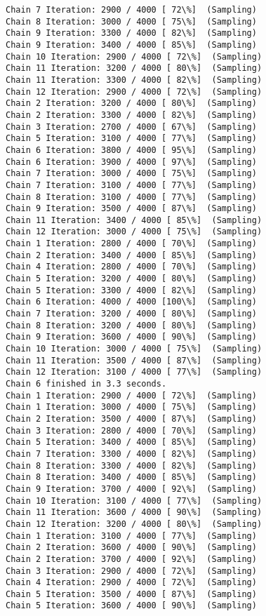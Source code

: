 \documentclass[11pt]{article}
\begin{document}
\begin{Verbatim}[commandchars=\\\{\}]
Chain 7 Iteration: 2900 / 4000 [ 72\%]  (Sampling)
Chain 8 Iteration: 3000 / 4000 [ 75\%]  (Sampling)
Chain 9 Iteration: 3300 / 4000 [ 82\%]  (Sampling)
Chain 9 Iteration: 3400 / 4000 [ 85\%]  (Sampling)
Chain 10 Iteration: 2900 / 4000 [ 72\%]  (Sampling)
Chain 11 Iteration: 3200 / 4000 [ 80\%]  (Sampling)
Chain 11 Iteration: 3300 / 4000 [ 82\%]  (Sampling)
Chain 12 Iteration: 2900 / 4000 [ 72\%]  (Sampling)
Chain 2 Iteration: 3200 / 4000 [ 80\%]  (Sampling)
Chain 2 Iteration: 3300 / 4000 [ 82\%]  (Sampling)
Chain 3 Iteration: 2700 / 4000 [ 67\%]  (Sampling)
Chain 5 Iteration: 3100 / 4000 [ 77\%]  (Sampling)
Chain 6 Iteration: 3800 / 4000 [ 95\%]  (Sampling)
Chain 6 Iteration: 3900 / 4000 [ 97\%]  (Sampling)
Chain 7 Iteration: 3000 / 4000 [ 75\%]  (Sampling)
Chain 7 Iteration: 3100 / 4000 [ 77\%]  (Sampling)
Chain 8 Iteration: 3100 / 4000 [ 77\%]  (Sampling)
Chain 9 Iteration: 3500 / 4000 [ 87\%]  (Sampling)
Chain 11 Iteration: 3400 / 4000 [ 85\%]  (Sampling)
Chain 12 Iteration: 3000 / 4000 [ 75\%]  (Sampling)
Chain 1 Iteration: 2800 / 4000 [ 70\%]  (Sampling)
Chain 2 Iteration: 3400 / 4000 [ 85\%]  (Sampling)
Chain 4 Iteration: 2800 / 4000 [ 70\%]  (Sampling)
Chain 5 Iteration: 3200 / 4000 [ 80\%]  (Sampling)
Chain 5 Iteration: 3300 / 4000 [ 82\%]  (Sampling)
Chain 6 Iteration: 4000 / 4000 [100\%]  (Sampling)
Chain 7 Iteration: 3200 / 4000 [ 80\%]  (Sampling)
Chain 8 Iteration: 3200 / 4000 [ 80\%]  (Sampling)
Chain 9 Iteration: 3600 / 4000 [ 90\%]  (Sampling)
Chain 10 Iteration: 3000 / 4000 [ 75\%]  (Sampling)
Chain 11 Iteration: 3500 / 4000 [ 87\%]  (Sampling)
Chain 12 Iteration: 3100 / 4000 [ 77\%]  (Sampling)
Chain 6 finished in 3.3 seconds.
Chain 1 Iteration: 2900 / 4000 [ 72\%]  (Sampling)
Chain 1 Iteration: 3000 / 4000 [ 75\%]  (Sampling)
Chain 2 Iteration: 3500 / 4000 [ 87\%]  (Sampling)
Chain 3 Iteration: 2800 / 4000 [ 70\%]  (Sampling)
Chain 5 Iteration: 3400 / 4000 [ 85\%]  (Sampling)
Chain 7 Iteration: 3300 / 4000 [ 82\%]  (Sampling)
Chain 8 Iteration: 3300 / 4000 [ 82\%]  (Sampling)
Chain 8 Iteration: 3400 / 4000 [ 85\%]  (Sampling)
Chain 9 Iteration: 3700 / 4000 [ 92\%]  (Sampling)
Chain 10 Iteration: 3100 / 4000 [ 77\%]  (Sampling)
Chain 11 Iteration: 3600 / 4000 [ 90\%]  (Sampling)
Chain 12 Iteration: 3200 / 4000 [ 80\%]  (Sampling)
Chain 1 Iteration: 3100 / 4000 [ 77\%]  (Sampling)
Chain 2 Iteration: 3600 / 4000 [ 90\%]  (Sampling)
Chain 2 Iteration: 3700 / 4000 [ 92\%]  (Sampling)
Chain 3 Iteration: 2900 / 4000 [ 72\%]  (Sampling)
Chain 4 Iteration: 2900 / 4000 [ 72\%]  (Sampling)
Chain 5 Iteration: 3500 / 4000 [ 87\%]  (Sampling)
Chain 5 Iteration: 3600 / 4000 [ 90\%]  (Sampling)

\end{Verbatim}
\end{document}
